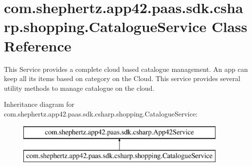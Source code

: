 \hypertarget{classcom_1_1shephertz_1_1app42_1_1paas_1_1sdk_1_1csharp_1_1shopping_1_1_catalogue_service}{\section{com.\+shephertz.\+app42.\+paas.\+sdk.\+csharp.\+shopping.\+Catalogue\+Service Class Reference}
\label{classcom_1_1shephertz_1_1app42_1_1paas_1_1sdk_1_1csharp_1_1shopping_1_1_catalogue_service}
}


This Service provides a complete cloud based catalogue management. An app can keep all its items based on category on the Cloud. This service provides several utility methods to manage catalogue on the cloud.  


Inheritance diagram for com.\+shephertz.\+app42.\+paas.\+sdk.\+csharp.\+shopping.\+Catalogue\+Service\+:\begin{figure}[H]
\begin{center}
\leavevmode
\includegraphics[height=2.000000cm]{classcom_1_1shephertz_1_1app42_1_1paas_1_1sdk_1_1csharp_1_1shopping_1_1_catalogue_service}
\end{center}
\end{figure}
